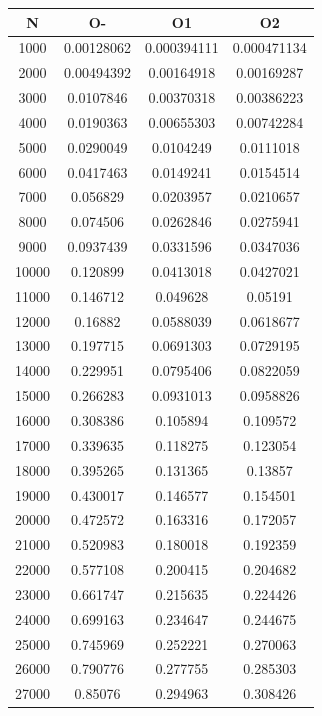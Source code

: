 \begin{center}
\begin{tabular}{| c | c | c | c |}
\hline
\textbf{N} & \textbf{O-} & \textbf{O1} & \textbf{O2} \\ \hline
1000 & 0.00128062 & 0.000394111 & 0.000471134 \\ \hline
2000 & 0.00494392 & 0.00164918 & 0.00169287 \\ \hline
3000 & 0.0107846 & 0.00370318 & 0.00386223 \\ \hline
4000 & 0.0190363 & 0.00655303 & 0.00742284 \\ \hline
5000 & 0.0290049 & 0.0104249 & 0.0111018 \\ \hline
6000 & 0.0417463 & 0.0149241 & 0.0154514 \\ \hline
7000 & 0.056829 & 0.0203957 & 0.0210657 \\ \hline
8000 & 0.074506 & 0.0262846 & 0.0275941 \\ \hline
9000 & 0.0937439 & 0.0331596 & 0.0347036 \\ \hline
10000 & 0.120899 & 0.0413018 & 0.0427021 \\ \hline
11000 & 0.146712 & 0.049628 & 0.05191 \\ \hline
12000 & 0.16882 & 0.0588039 & 0.0618677 \\ \hline
13000 & 0.197715 & 0.0691303 & 0.0729195 \\ \hline
14000 & 0.229951 & 0.0795406 & 0.0822059 \\ \hline
15000 & 0.266283 & 0.0931013 & 0.0958826 \\ \hline
16000 & 0.308386 & 0.105894 & 0.109572 \\ \hline
17000 & 0.339635 & 0.118275 & 0.123054 \\ \hline
18000 & 0.395265 & 0.131365 & 0.13857 \\ \hline
19000 & 0.430017 & 0.146577 & 0.154501 \\ \hline
20000 & 0.472572 & 0.163316 & 0.172057 \\ \hline
21000 & 0.520983 & 0.180018 & 0.192359 \\ \hline
22000 & 0.577108 & 0.200415 & 0.204682 \\ \hline
23000 & 0.661747 & 0.215635 & 0.224426 \\ \hline
24000 & 0.699163 & 0.234647 & 0.244675 \\ \hline
25000 & 0.745969 & 0.252221 & 0.270063 \\ \hline
26000 & 0.790776 & 0.277755 & 0.285303 \\ \hline
27000 & 0.85076 & 0.294963 & 0.308426 \\ \hline

\end{tabular}
\end{center}
